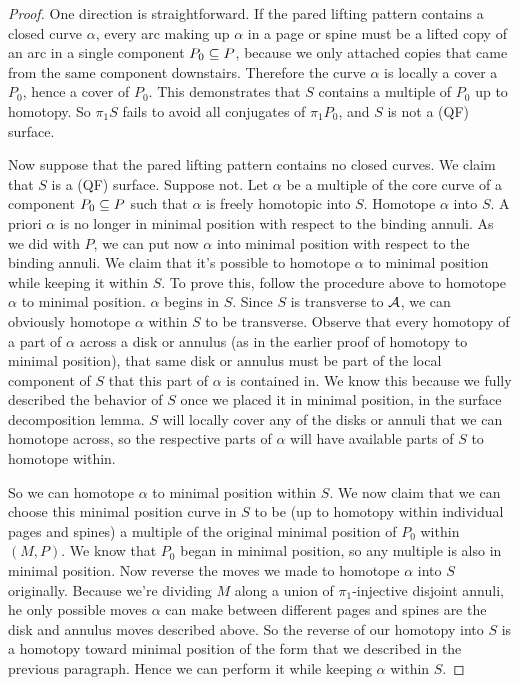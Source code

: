 \begin{proof}

One direction is straightforward. If the pared lifting pattern contains
a closed curve $\alpha$, every arc making up $\alpha$ in a page or spine must
be a lifted copy of an arc in a single component $P_0 \subseteq P$, because we only
attached copies that came from the same component downstairs. Therefore the
curve $\alpha$ is locally a cover a $P_0$, hence a cover of $P_0$. This
demonstrates that $S$ contains a multiple of $P_0$ up to homotopy. So $\pi_1S$
fails to avoid all conjugates of $\pi_1P_0$, and $S$ is not a (QF) surface.

Now suppose that the pared lifting pattern contains no closed curves. We claim
that $S$ is a (QF) surface. Suppose not. Let $\alpha$ be a multiple of the core
curve of a component $P_0 \subseteq  P$ such that $\alpha$ is freely homotopic into
$S$.  Homotope $\alpha$ into $S$. A priori $\alpha$ is no longer in minimal
position with respect to the binding annuli. As we did with $P$, we can put now
$\alpha$ into minimal position with respect to the binding annuli.  We claim
that it's possible to homotope $\alpha$ to minimal position while keeping it
within $S$.  To prove this, follow the procedure above to homotope $\alpha$ to
minimal position.  $\alpha$ begins in $S$.  Since $S$ is transverse to $\mathcal{A}$,
we can obviously homotope $\alpha$ within $S$ to be transverse.  Observe that
every homotopy of a part of $\alpha$ across a disk or annulus (as in the
earlier proof of homotopy to minimal position), that same disk or annulus must
be part of the local component of $S$ that this part of $\alpha$ is contained
in.  We know this because we fully described the behavior of $S$ once we placed
it in minimal position, in the surface decomposition lemma.  $S$ will locally
cover any of the disks or annuli that we can homotope across, so the respective
parts of $\alpha$ will have available parts of $S$ to homotope within.

So we can homotope $\alpha$ to minimal position within $S$. We now claim that
we can choose this minimal position curve in $S$ to be (up to homotopy within
individual pages and spines) a multiple of the original minimal position of
$P_0$ within $(M,P)$. We know that $P_0$ began in minimal position, so any
multiple is also in minimal position. Now reverse the moves we made to homotope
$\alpha$ into $S$ originally. Because we're dividing $M$ along a union of
$\pi_1$-injective disjoint annuli, he only possible moves $\alpha$ can make
between different pages and spines are the disk and annulus moves described
above. So the reverse of our homotopy into $S$ is a homotopy toward minimal
position of the form that we described in the previous paragraph. Hence we can
perform it while keeping $\alpha$ within $S$.


\end{proof}
